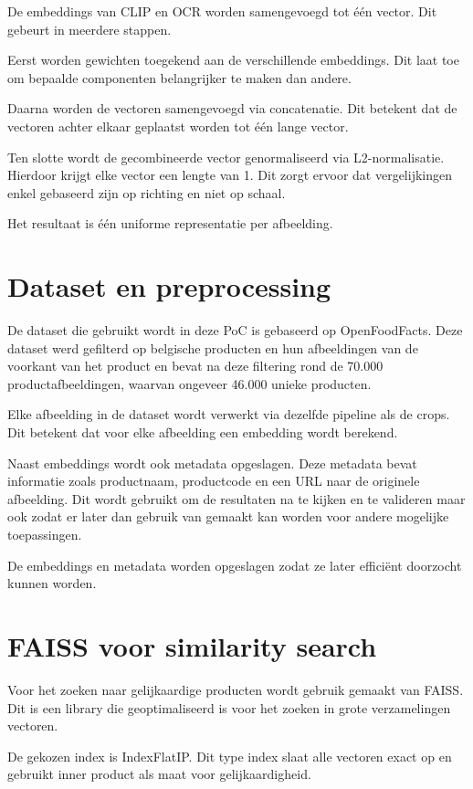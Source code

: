 De embeddings van CLIP en OCR worden samengevoegd tot één vector. Dit gebeurt in meerdere stappen.

Eerst worden gewichten toegekend aan de verschillende embeddings. Dit laat toe om bepaalde componenten belangrijker te maken dan andere.

Daarna worden de vectoren samengevoegd via concatenatie. Dit betekent dat de vectoren achter elkaar geplaatst worden tot één lange vector.

Ten slotte wordt de gecombineerde vector genormaliseerd via L2-normalisatie. Hierdoor krijgt elke vector een lengte van 1. Dit zorgt ervoor dat vergelijkingen enkel gebaseerd zijn op richting en niet op schaal.

Het resultaat is één uniforme representatie per afbeelding.

\section{Dataset en preprocessing}

De dataset die gebruikt wordt in deze PoC is gebaseerd op OpenFoodFacts. Deze dataset werd gefilterd op belgische producten en hun afbeeldingen van de voorkant van het product en bevat na deze filtering rond de 70.000 productafbeeldingen, waarvan ongeveer 46.000 unieke producten.

Elke afbeelding in de dataset wordt verwerkt via dezelfde pipeline als de crops. Dit betekent dat voor elke afbeelding een embedding wordt berekend.

Naast embeddings wordt ook metadata opgeslagen. Deze metadata bevat informatie zoals productnaam, productcode en een URL naar de originele afbeelding. Dit wordt gebruikt om de resultaten na te kijken en te valideren maar ook zodat er later dan gebruik van gemaakt kan worden voor andere mogelijke toepassingen.

De embeddings en metadata worden opgeslagen zodat ze later efficiënt doorzocht kunnen worden.

\section{FAISS voor similarity search}

Voor het zoeken naar gelijkaardige producten wordt gebruik gemaakt van FAISS. Dit is een library die geoptimaliseerd is voor het zoeken in grote verzamelingen vectoren.

De gekozen index is IndexFlatIP. Dit type index slaat alle vectoren exact op en gebruikt inner product als maat voor gelijkaardigheid.

